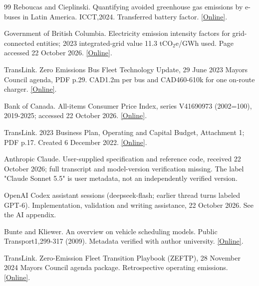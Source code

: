 \begin{thebibliography}{99}
 Reboucas and Cieplinski. Quantifying avoided greenhouse gas emissions by e-buses in Latin America. ICCT,2024. Transferred battery factor. \href{https://theicct.org/wp-content/uploads/2024/08/ID-118-%E2%80%93-E-bus-radar_final2.pdf}{[Online]}.

 Government of British Columbia. Electricity emission intensity factors for grid-connected entities; 2023 integrated-grid value 11.3 tCO$_2$e/GWh used. Page accessed 22 October 2026. \href{https://www2.gov.bc.ca/gov/content/environment/climate-change/data/electricity}{[Online]}.

 TransLink. Zero Emissions Bus Fleet Technology Update, 29 June 2023 Mayors Council agenda, PDF p.29. CAD1.2m per bus and CAD460-610k for one on-route charger. \href{https://www.translink.ca/-/media/translink/documents/about-translink/governance-and-board/council-minutes-and-reports/2023/june/agenda_mayors_council_public_mtg_june_2023.pdf}{[Online]}.

 Bank of Canada. All-items Consumer Price Index, series V41690973 (2002=100), 2019-2025; accessed 22 October 2026. \href{https://www.bankofcanada.ca/valet/observations/V41690973/json?start_date=2019-01-01&end_date=2025-12-31}{[Online]}.

 TransLink. 2023 Business Plan, Operating and Capital Budget, Attachment 1; PDF p.17. Created 6 December 2022. \href{https://www.translink.ca/-/media/translink/documents/about-translink/corporate-reports/business_plan/2023_business_plan_operating_and_capital_budget.pdf}{[Online]}.

 Anthropic Claude. User-supplied specification and reference code, received 22 October 2026; full transcript and model-version verification missing. The label "Claude Sonnet 5.5" is user metadata, not an independently verified version.

 OpenAI Codex assistant sessions (deepseek-flash; earlier thread turns labeled GPT-6). Implementation, validation and writing assistance, 22 October 2026. See the AI appendix.

 Bunte and Kliewer. An overview on vehicle scheduling models. Public Transport1,299-317 (2009). Metadata verified with author university. \href{https://www.wiwiss.fu-berlin.de/fachbereich/bwl/pwo/kliewer/forschung/testpub/article_-an-overview-on-vehicle-scheduling-models-in-public-transport/index.html}{[Online]}.

 TransLink. Zero-Emission Fleet Transition Playbook (ZEFTP), 28 November 2024 Mayors Council agenda package. Retrospective operating emissions. \href{https://www.translink.ca/-/media/translink/documents/about-translink/governance-and-board/council-minutes-and-reports/2024/november/agenda--mayors-council--public-mtg--nov-28-2024.pdf}{[Online]}.


\end{thebibliography}
